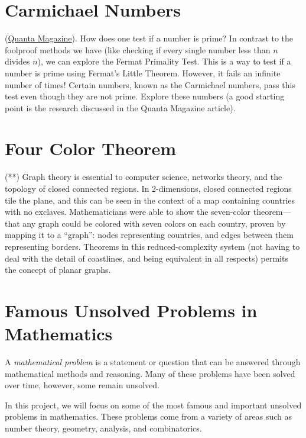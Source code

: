 \documentclass{article}
\begin{document}
\pagebreak

\section{ Carmichael Numbers} (\hyperlink{https://www.quantamagazine.org/teenager-solves-stubborn-riddle-about-prime-number-look-alikes-20221013/}{Quanta Magazine}). How does one test if a number is prime? In contrast to the foolproof methods we have (like checking if every single number less than $n$ divides $n$), we can explore the Fermat Primality Test. This is a way to test if a number is prime using Fermat's Little Theorem. However, it fails an infinite number of times! Certain numbers, known as the Carmichael numbers, pass this test even though they are not prime. Explore these numbers (a good starting point is the research discussed in the Quanta Magazine article).
        
\pagebreak

\section{Four Color Theorem} (**)
    Graph theory is essential to computer science, networks theory, and the topology of closed connected regions.
    In 2-dimensions, closed connected regions tile the plane, and this can be seen in the context of a map containing countries with no exclaves.
    Mathematicians were able to show the seven-color theorem---that any graph could be colored with seven colors on each country, proven by mapping it to a ``graph'': nodes representing countries, and edges between them representing borders.
    Theorems in this reduced-complexity system (not having to deal with the detail of coastlines, and being equivalent in all respects) permits the concept of planar graphs.

\pagebreak

\section{Famous Unsolved Problems in Mathematics}
    A \textit{mathematical problem} is a statement or question that can be answered through mathematical methods and reasoning. Many of these problems have been solved over time, however, some remain unsolved.
    
    
    \vspace{3mm}
    In this project, we will focus on some of the most famous and important unsolved problems in mathematics. These problems come from a variety of areas such as number theory, geometry, analysis, and combinatorics. 
    
\end{document}
